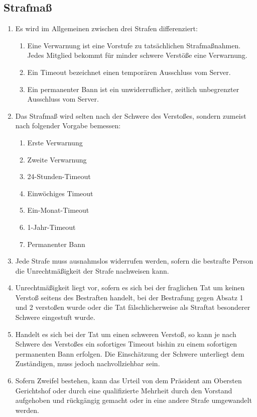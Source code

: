 \documentclass{article}
\begin{document}
\subsection{Strafmaß}
\begin{enumerate}[(1)]
	\item Es wird im Allgemeinen zwischen drei Strafen differenziert:
	\begin{enumerate}[1.]
		\item Eine Verwarnung ist eine Vorstufe zu tatsächlichen Strafmaßnahmen. Jedes Mitglied bekommt für minder schwere Verstöße eine Verwarnung.
		\item Ein Timeout bezeichnet einen temporären Ausschluss vom Server.
		\item Ein permanenter Bann ist ein unwiderruflicher, zeitlich unbegrenzter Ausschluss vom Server.
	\end{enumerate}
	\item Das Strafmaß wird selten nach der Schwere des Verstoßes, sondern zumeist nach folgender Vorgabe bemessen:
	\begin{enumerate}[1.]
		\item Erste Verwarnung
		\item Zweite Verwarnung
		\item 24-Stunden-Timeout
		\item Einwöchiges Timeout
		\item Ein-Monat-Timeout
		\item 1-Jahr-Timeout
		\item Permanenter Bann
	\end{enumerate}
	\item Jede Strafe muss ausnahmslos widerrufen werden, sofern die bestrafte Person die Unrechtmäßigkeit der Strafe nachweisen kann.
	\item Unrechtmäßigkeit liegt vor, sofern es sich bei der fraglichen Tat um keinen Verstoß seitens des Bestraften handelt, bei der Bestrafung gegen Absatz 1 und 2 verstoßen wurde oder die Tat fälschlicherweise als Straftat besonderer Schwere eingestuft wurde.
	\item Handelt es sich bei der Tat um einen schweren Verstoß, so kann je nach Schwere des Verstoßes ein sofortiges Timeout bishin zu einem sofortigen permanenten Bann erfolgen. Die Einschätzung der Schwere unterliegt dem Zuständigen, muss jedoch nachvollziehbar sein. 
	\item Sofern Zweifel bestehen, kann das Urteil von dem Präsident am Obersten Gerichtshof oder durch eine qualifizierte Mehrheit durch den Vorstand aufgehoben und rückgängig gemacht oder in eine andere Strafe umgewandelt werden.

\end{enumerate}
\end{document}
